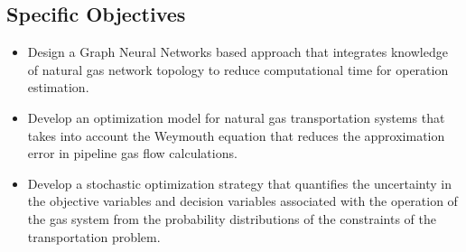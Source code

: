 \subsection{Specific Objectives}
\begin{itemize}

\item Design a Graph Neural Networks based approach that integrates knowledge of natural gas network topology to reduce computational time for operation estimation.

\item Develop an optimization model for natural gas transportation systems that takes into account the Weymouth equation that reduces the approximation error in pipeline gas flow calculations.

\item Develop a stochastic optimization strategy that quantifies the uncertainty in the objective variables and decision variables associated with the operation of the gas system from the probability distributions of the constraints of the transportation problem.

\end{itemize}













	
	
     
	





  
